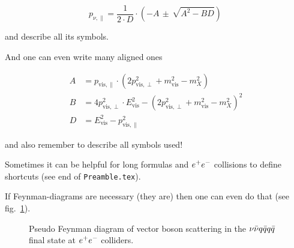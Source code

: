\begin{equation} \label{EQ:ExactNeutrinoSolution}
  p_{\nu,\parallel} = \frac{1}{2 \cdot D} \cdot \left(-A \, \pm\, \sqrt{A^2 - BD} \right) \, 
\end{equation}

and describe all its symbols.

And one can even write many aligned ones

 \begin{align}
  A & =p_{\text{vis},\parallel} \cdot ( 2 p_{\text{vis},\perp}^2 + m_{\text{vis}}^2 - m_{X}^2) \\
  B & =4 p_{\text{vis},\perp}^2 \cdot E_{\text{vis}}^2 - ( 2 p_{\text{vis},\perp}^2 + m_{\text{vis}}^2 - m_{X}^2 )^2 \\
  D & =E_{\text{vis}}^2- p_{\text{vis},\parallel}^2
\end{align}

and also remember to describe all symbols used!

Sometimes it can be helpful for long formulas and $e^{+}e^{-}$ collisions to define shortcuts (see end of \texttt{Preamble.tex}).

If Feynman-diagrams are necessary (they are) then one can even do that (see fig.~\ref{FEY:SignalProcess}).

\begin{figure} 
  \centering
  
  \caption{Pseudo Feynman diagram of vector boson scattering in the $\nu\bar{\nu} q\bar{q} q\bar{q}$ final state at $e^{+}e^{-}$ colliders.}
  \label{FEY:SignalProcess}
\end{figure}